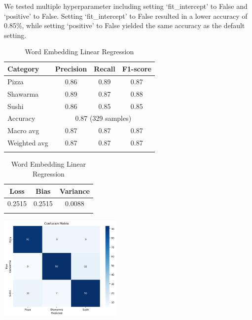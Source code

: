 We tested multiple hyperparameter including setting `fit\_intercept' to False and `positive' to False. Setting `fit\_intercept' to False resulted in a lower accuracy of 0.85\%, while setting `positive' to False yielded the same accuracy as the default setting.

\begin{table}[h]
    \centering
    \begin{tabular}{lccc}
        \hline
        Category     & Precision                              & Recall & F1-score \\
        \hline
        Pizza        & 0.86                                   & 0.89   & 0.87     \\
        Shawarma     & 0.89                                   & 0.87   & 0.88     \\
        Sushi        & 0.86                                   & 0.85   & 0.85     \\
        \hline
        Accuracy     & \multicolumn{3}{c}{0.87 (329 samples)}                     \\
        Macro avg    & 0.87                                   & 0.87   & 0.87     \\
        Weighted avg & 0.87                                   & 0.87   & 0.87     \\
        \hline                                                                    \\
    \end{tabular}
    \begin{tabular}{ccc}
        \hline
        Loss   & Bias   & Variance \\
        \hline
        0.2515 & 0.2515 & 0.0088   \\
        \hline                     \\
    \end{tabular}
    \includegraphics[width=0.45\textwidth]{model/linearregression_confusion.png}
    \caption{Word Embedding Linear Regression}
\end{table}


